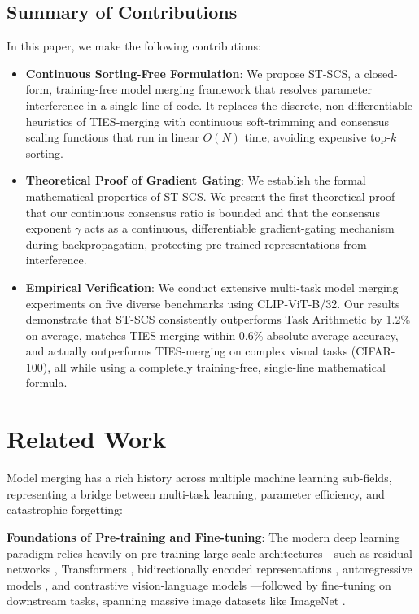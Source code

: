 \documentclass{article}
\theoremstyle{plain}
\theoremstyle{definition}
\theoremstyle{remark}
\begin{document}
\subsection{Summary of Contributions}
In this paper, we make the following contributions:
\begin{itemize}
    \item \textbf{Continuous Sorting-Free Formulation}: We propose ST-SCS, a closed-form, training-free model merging framework that resolves parameter interference in a single line of code. It replaces the discrete, non-differentiable heuristics of TIES-merging with continuous soft-trimming and consensus scaling functions that run in linear $O(N)$ time, avoiding expensive top-$k$ sorting.
    \item \textbf{Theoretical Proof of Gradient Gating}: We establish the formal mathematical properties of ST-SCS. We present the first theoretical proof that our continuous consensus ratio is bounded and that the consensus exponent $\gamma$ acts as a continuous, differentiable gradient-gating mechanism during backpropagation, protecting pre-trained representations from interference.
    \item \textbf{Empirical Verification}: We conduct extensive multi-task model merging experiments on five diverse benchmarks using CLIP-ViT-B/32. Our results demonstrate that ST-SCS consistently outperforms Task Arithmetic by 1.2\% on average, matches TIES-merging within 0.6\% absolute average accuracy, and actually outperforms TIES-merging on complex visual tasks (CIFAR-100), all while using a completely training-free, single-line mathematical formula.
\end{itemize}

\section{Related Work}
\label{sec:related}
Model merging has a rich history across multiple machine learning sub-fields, representing a bridge between multi-task learning, parameter efficiency, and catastrophic forgetting:

\textbf{Foundations of Pre-training and Fine-tuning}: The modern deep learning paradigm relies heavily on pre-training large-scale architectures—such as residual networks \cite{He2016}, Transformers \cite{Vaswani2017}, bidirectionally encoded representations \cite{Devlin2019}, autoregressive models \cite{Brown2020}, and contrastive vision-language models \cite{Radford2021}—followed by fine-tuning on downstream tasks, spanning massive image datasets like ImageNet \cite{Deng2009}.
\end{document}
